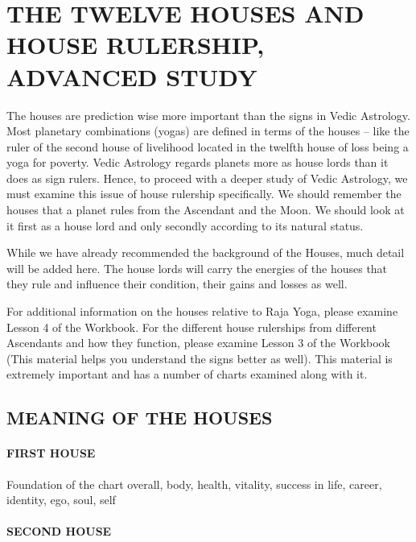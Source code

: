 \section{THE TWELVE HOUSES AND HOUSE RULERSHIP, ADVANCED STUDY}
 

The houses are prediction wise more important than the signs in Vedic Astrology. Most planetary combinations (yogas) are defined in terms of the houses – like the ruler of the second house of livelihood located in the twelfth house of loss being a yoga for poverty. Vedic Astrology regards planets more as house lords than it does as sign rulers. Hence, to proceed with a deeper study of Vedic Astrology, we must examine this issue of house rulership specifically. We should remember the houses that a planet rules from the Ascendant and the Moon. We should look at it first as a house lord and only secondly according to its natural status.

 

While we have already recommended the background of the Houses, much detail will be added here. The house lords will carry the energies of the houses that they rule and influence their condition, their gains and losses as well.

 

For additional information on the houses relative to Raja Yoga, please examine Lesson 4 of the Workbook. For the different house rulerships from different Ascendants and how they function, please examine Lesson 3 of the Workbook (This material helps you understand the signs better as well). This material is extremely important and has a number of charts examined along with it.

 

\subsection{MEANING OF THE HOUSES}

\paragraph{FIRST HOUSE}

Foundation of the chart overall, body, health, vitality, success in life, career, identity, ego, soul, self

\paragraph{SECOND HOUSE}

